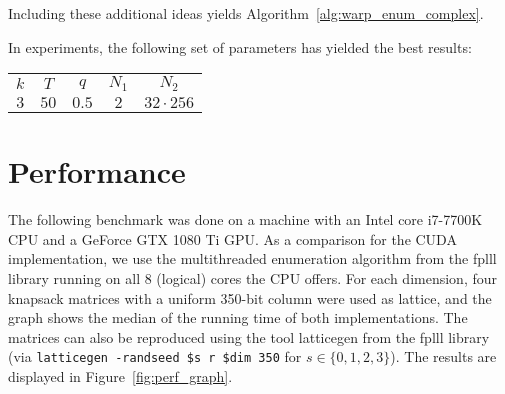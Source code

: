 \documentclass{scrartcl}
\begin{document}
    Including these additional ideas yields Algorithm~\ref{alg:warp_enum_complex}.

    In experiments, the following set of parameters has yielded the best results:
    
    \begin{center}
        \begin{tabular}[5]{c c c c c}
            $k$ & $T$ & $q$ & $N_1$ & $N_2$ \\
            $3$ & $50$ & $0.5$ & $2$ & $32 \cdot 256$
        \end{tabular}
    \end{center}

    \section{Performance}


    The following benchmark was done on a machine with an Intel core i7-7700K CPU and a GeForce GTX 1080 Ti GPU. As a comparison for the CUDA implementation, we use the multithreaded enumeration algorithm from the fplll library \cite{fplll} running on all 8 (logical) cores the CPU offers.
    For each dimension, four knapsack matrices with a uniform 350-bit column were used as lattice, and the graph shows the median of the running time of both implementations. The matrices can also be reproduced using the tool latticegen from the fplll library (via \texttt{latticegen -randseed \$s r \$dim 350} for $s \in \{0, 1, 2, 3\}$).
    The results are displayed in Figure~\ref{fig:perf_graph}.
\end{document}
